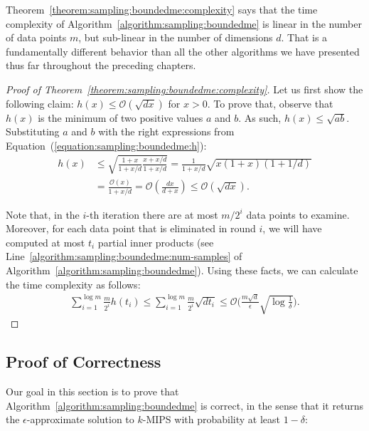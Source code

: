 \begin{svgraybox}
    Theorem~\ref{theorem:sampling:boundedme:complexity} says that the time complexity
    of Algorithm~\ref{algorithm:sampling:boundedme} is linear in the number of data points
    $m$, but sub-linear in the number of dimensions $d$. That is a fundamentally different
    behavior than all the other algorithms we have presented thus far throughout the preceding
    chapters.
\end{svgraybox}

\begin{proof}[Proof of Theorem~\ref{theorem:sampling:boundedme:complexity}]
    Let us first show the following claim: $h(x) \leq \mathcal{O}(\sqrt{dx})$ for $x > 0$.
    To prove that, observe that $h(x)$ is the minimum of two positive values $a$ and $b$.
    As such, $h(x) \leq \sqrt{ab}$. Substituting $a$ and $b$ with the right expressions
    from Equation~(\ref{equation:sampling:boundedme:h}):
    \begin{align*}
        h(x) &\leq \sqrt{\frac{1 + x}{1 + x/d} \frac{x + x/d}{1 + x/d}}
        = \frac{1}{1 + x/d} \sqrt{x(1 + x)(1 + 1/d)} \\
        &= \frac{\mathcal{O}(x)}{1 + x/d}
        = \mathcal{O}(\frac{dx}{d + x}) \leq \mathcal{O}(\sqrt{dx}).
    \end{align*}

    Note that, in the $i$-th iteration there are at most $m/2^i$ data points to examine.
    Moreover, for each data point that is eliminated in round $i$, we will have computed
    at most $t_i$ partial inner products (see Line~\ref{algorithm:sampling:boundedme:num-samples}
    of Algorithm~\ref{algorithm:sampling:boundedme}).
    Using these facts, we can calculate the time complexity as follows:
    \begin{align*}
        \sum_{i = 1}^{\log m} \frac{m}{2^i} h(t_i) \leq 
        \sum_{i = 1}^{\log m} \frac{m}{2^i} \sqrt{d t_i} \leq
        \mathcal{O}\Big(\frac{m \sqrt{d}}{\epsilon} \sqrt{\log\frac{1}{\delta}} \Big).
    \end{align*}
\end{proof}

\subsection{Proof of Correctness}
Our goal in this section is to prove that Algorithm~\ref{algorithm:sampling:boundedme}
is correct, in the sense that it returns the $\epsilon$-approximate solution to $k$-MIPS
with probability at least $1 - \delta$:

